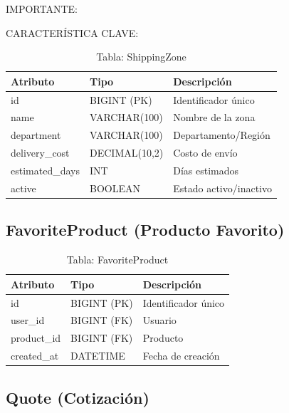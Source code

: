 \documentclass[12pt,a4paper,oneside]{book}
\begin{document}
\begin{alert}{IMPORTANTE:}
\begin{info}{CARACTERÍSTICA CLAVE:}
\begin{table}[ht]
    \centering
    \caption{Tabla: ShippingZone}
    \begin{tabular}{@{}lll@{}}
        \toprule
        \textbf{Atributo} & \textbf{Tipo} & \textbf{Descripción} \\
        \midrule
        id & BIGINT (PK) & Identificador único \\
        name & VARCHAR(100) & Nombre de la zona \\
        department & VARCHAR(100) & Departamento/Región \\
        delivery\_cost & DECIMAL(10,2) & Costo de envío \\
        estimated\_days & INT & Días estimados \\
        active & BOOLEAN & Estado activo/inactivo \\
        \bottomrule
    \end{tabular}
\end{table}

\subsection{FavoriteProduct (Producto Favorito)}
\label{sec:favoriteproduct}

\begin{table}[ht]
    \centering
    \caption{Tabla: FavoriteProduct}
    \begin{tabular}{@{}lll@{}}
        \toprule
        \textbf{Atributo} & \textbf{Tipo} & \textbf{Descripción} \\
        \midrule
        id & BIGINT (PK) & Identificador único \\
        user\_id & BIGINT (FK) & Usuario \\
        product\_id & BIGINT (FK) & Producto \\
        created\_at & DATETIME & Fecha de creación \\
        \bottomrule
    \end{tabular}
\end{table}

\subsection{Quote (Cotización)}
\label{sec:quote}


\end{info}
\end{alert}
\end{document}
